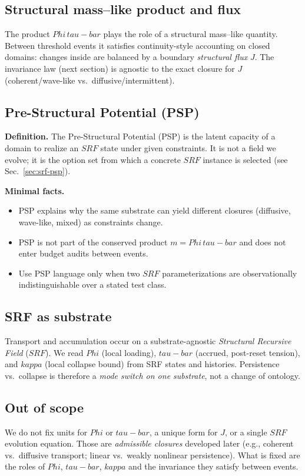 \documentclass[12pt]{article}
\newcommand{\FoldDensity}{\Phi}
\newcommand{\FoldTime}{\bar{\tau}}
\newcommand{\Threshold}{\kappa}
\newcommand{\SRF}{\mathcal{F}_{\mathrm{SR}}}
\def\FoldDensity{Phi}%
\def\FoldTime{tau-bar}%
\def\Threshold{kappa}%
\def\SRF{SRF}%
\def\bar#1{#1}%
\def\mathcal#1{#1}%
\def\mathrm#1{#1}%
\begin{document}
\subsection{Structural mass--like product and flux}
The product $\FoldDensity\,\FoldTime$ plays the role of a structural mass--like quantity.
Between threshold events it satisfies continuity-style accounting on closed domains:
changes inside are balanced by a boundary \emph{structural flux} $J$.
The invariance law (next section) is agnostic to the exact closure for $J$ (coherent/wave-like vs.\ diffusive/intermittent).

\subsection{Pre-Structural Potential (PSP)}\label{sec:psp-core}
\textbf{Definition.} The Pre-Structural Potential (PSP) is the latent capacity of a domain to realize an $\SRF$ state under given constraints. It is not a field we evolve; it is the option set from which a concrete $\SRF$ instance is selected (see Sec.~\ref{sec:srf-psp}).

\textbf{Minimal facts.}
\begin{itemize}
  \item PSP explains why the same substrate can yield different closures (diffusive, wave-like, mixed) as constraints change.
  \item PSP is not part of the conserved product $m=\FoldDensity\,\FoldTime$ and does not enter budget audits between events.
  \item Use PSP language only when two $\SRF$ parameterizations are observationally indistinguishable over a stated test class.
\end{itemize}


\subsection{SRF as substrate}
Transport and accumulation occur on a substrate-agnostic \emph{Structural Recursive Field} ($\SRF$).
We read $\FoldDensity$ (local loading), $\FoldTime$ (accrued, post-reset tension), and $\Threshold$ (local collapse bound) from SRF states and histories.
Persistence vs.\ collapse is therefore a \emph{mode switch on one substrate}, not a change of ontology.

\subsection{Out of scope}
We do not fix units for $\FoldDensity$ or $\FoldTime$, a unique form for $J$, or a single $\SRF$ evolution equation.
Those are \emph{admissible closures} developed later (e.g., coherent vs.\ diffusive transport; linear vs.\ weakly nonlinear persistence).
What is fixed are the roles of $\FoldDensity$, $\FoldTime$, $\Threshold$ and the invariance they satisfy between events.
\end{document}
